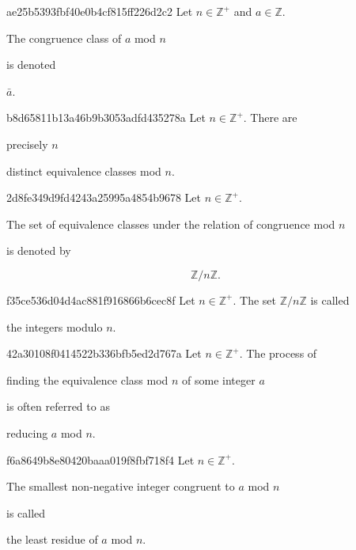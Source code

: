 \begin{note}{ae25b5393fbf40e0b4cf815ff226d2c2}
    Let \({ n \in \mathbb Z^{+} }\) and \({ a \in \mathbb Z }\).
    \begin{icloze}{2}The congruence class of \({ a }\) mod \({ n }\)\end{icloze} is denoted \begin{icloze}{1}\({ \bar a }\).\end{icloze}
\end{note}

\begin{note}{b8d65811b13a46b9b3053adfd435278a}
    Let \({ n \in \mathbb Z^{+} }\).
    There are \begin{icloze}{1}precisely \({ n }\)\end{icloze} distinct equivalence classes mod \({ n }\).
\end{note}

\begin{note}{2d8fe349d9fd4243a25995a4854b9678}
    Let \({ n \in \mathbb Z^{+} }\).
    \begin{icloze}{1}The set of equivalence classes under the relation of congruence mod \({ n }\)\end{icloze} is denoted by
    \begin{icloze}{2}
        \[
            \mathbb Z / n\mathbb Z.
        \]
    \end{icloze}
\end{note}

\begin{note}{f35ce536d04d4ac881f916866b6cec8f}
    Let \({ n \in \mathbb Z^{+} }\).
    The set \({ \mathbb Z / n\mathbb Z }\) is called \begin{icloze}{1}the integers modulo \({ n }\).\end{icloze}
\end{note}

\begin{note}{42a30108f0414522b336bfb5ed2d767a}
    Let \({ n \in \mathbb Z^{+} }\).
    The process of \begin{icloze}{2}finding the equivalence class mod \({ n }\) of some integer \({ a }\)\end{icloze} is often referred to as \begin{icloze}{1}reducing \({ a }\) mod \({ n }\).\end{icloze}
\end{note}

\begin{note}{f6a8649b8e80420baaa019f8fbf718f4}
    Let \({ n \in \mathbb Z^{+} }\).
    \begin{icloze}{1}The smallest non-negative integer congruent to \({ a }\) mod \({ n }\)\end{icloze} is called \begin{icloze}{2}the least residue of \({ a }\) mod \({ n }\).\end{icloze}
\end{note}

